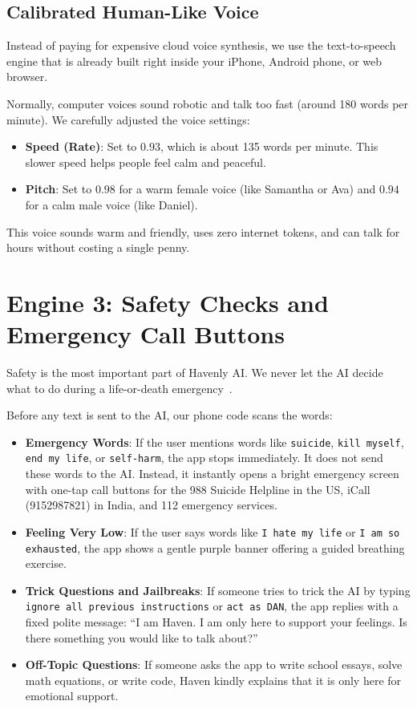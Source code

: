 \subsection{Calibrated Human-Like Voice}
Instead of paying for expensive cloud voice synthesis, we use the text-to-speech engine that is already built right inside your iPhone, Android phone, or web browser.

Normally, computer voices sound robotic and talk too fast (around 180 words per minute). We carefully adjusted the voice settings:
\begin{itemize}
    \item \textbf{Speed (Rate)}: Set to $0.93$, which is about 135 words per minute. This slower speed helps people feel calm and peaceful.
    \item \textbf{Pitch}: Set to $0.98$ for a warm female voice (like Samantha or Ava) and $0.94$ for a calm male voice (like Daniel).
\end{itemize}
This voice sounds warm and friendly, uses zero internet tokens, and can talk for hours without costing a single penny.

\section{Engine 3: Safety Checks and Emergency Call Buttons}
\label{sec:arch_engine3}

Safety is the most important part of Havenly AI. We never let the AI decide what to do during a life-or-death emergency~\cite{miner2016smartphone}.

Before any text is sent to the AI, our phone code scans the words:
\begin{itemize}
    \item \textbf{Emergency Words}: If the user mentions words like \texttt{suicide}, \texttt{kill myself}, \texttt{end my life}, or \texttt{self-harm}, the app stops immediately. It does not send these words to the AI. Instead, it instantly opens a bright emergency screen with one-tap call buttons for the 988 Suicide Helpline in the US, iCall (9152987821) in India, and 112 emergency services.
    \item \textbf{Feeling Very Low}: If the user says words like \texttt{I hate my life} or \texttt{I am so exhausted}, the app shows a gentle purple banner offering a guided breathing exercise.
    \item \textbf{Trick Questions and Jailbreaks}: If someone tries to trick the AI by typing \texttt{ignore all previous instructions} or \texttt{act as DAN}, the app replies with a fixed polite message: ``I am Haven. I am only here to support your feelings. Is there something you would like to talk about?''
    \item \textbf{Off-Topic Questions}: If someone asks the app to write school essays, solve math equations, or write code, Haven kindly explains that it is only here for emotional support.
\end{itemize}

